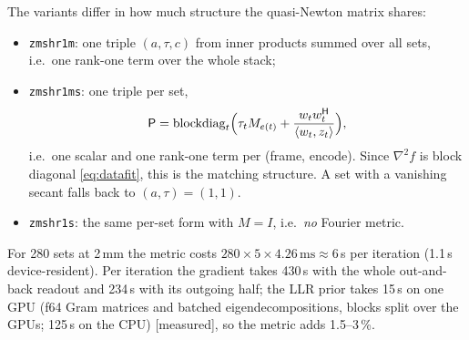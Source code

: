 \documentclass[11pt]{article}
\theoremstyle{remark}
\newcommand{\herm}{\mathsf H}
\begin{document}
The variants differ in how much structure the quasi-Newton matrix shares:
\begin{itemize}
  \item \texttt{zmshr1m}: one triple $(a,\tau,c)$ from inner products summed over all sets, i.e.\ one rank-one term over the whole stack;
  \item \texttt{zmshr1ms}: one triple per set,
  \[
    \mathsf P=\operatorname{blockdiag}_t\Bigl(\tau_tM_{e(t)}+\frac{w_tw_t^\herm}{\langle w_t,z_t\rangle}\Bigr),
  \]
  i.e.\ one scalar and one rank-one term per (frame, encode). Since $\nabla^2f$ is block diagonal \eqref{eq:datafit}, this is the matching structure. A set with a vanishing secant falls back to $(a,\tau)=(1,1)$.
  \item \texttt{zmshr1s}: the same per-set form with $M=I$, i.e.\ \emph{no} Fourier metric.
\end{itemize}
For 280 sets at 2\,mm the metric costs $280\times5\times4.26\,\text{ms}\approx6$\,s per iteration (1.1\,s device-resident). Per iteration the gradient takes 430\,s with the whole out-and-back readout and 234\,s with its outgoing half; the LLR prior takes 15\,s on one GPU (f64 Gram matrices and batched eigendecompositions, blocks split over the GPUs; 125\,s on the CPU) [measured], so the metric adds 1.5--3\,\%.
\end{document}
